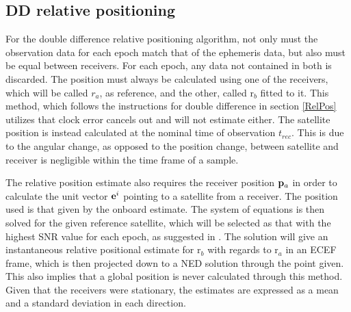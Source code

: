 \subsection{DD relative positioning}
For the double difference relative positioning algorithm, not only must the observation data for each epoch match that of the ephemeris data, but also must be equal between receivers. For each epoch, any data not contained in both is discarded. The position must always be calculated using one of the receivers, which will be called $r_a$, as reference, and the other, called r$_b$ fitted to it. This method, which follows the instructions for double difference in section \ref{RelPos} utilizes that clock error cancels out and will not estimate either. The satellite position is instead calculated at the nominal time of observation $t_{rec}$. This is due to the angular change, as opposed to the position change, between satellite and receiver is negligible within the time frame of a sample. 
\par
The relative position estimate also requires the receiver position ${\bf p}_a$ in order to calculate the unit vector ${\bf e}^i$ pointing to a satellite from a receiver. The position used is that given by the onboard estimate. The system of equations is then solved for the given reference satellite, which will be selected as that with the highest SNR value for each epoch, as suggested in \cite{BLUE}. The solution will give an instantaneous relative positional estimate for r$_b$ with regards to r$_a$ in an ECEF frame, which is then projected down to a NED solution through the point given. This also implies that a global position is never calculated through this method. Given that the receivers were stationary, the estimates are expressed as a mean and a standard deviation in each direction.


